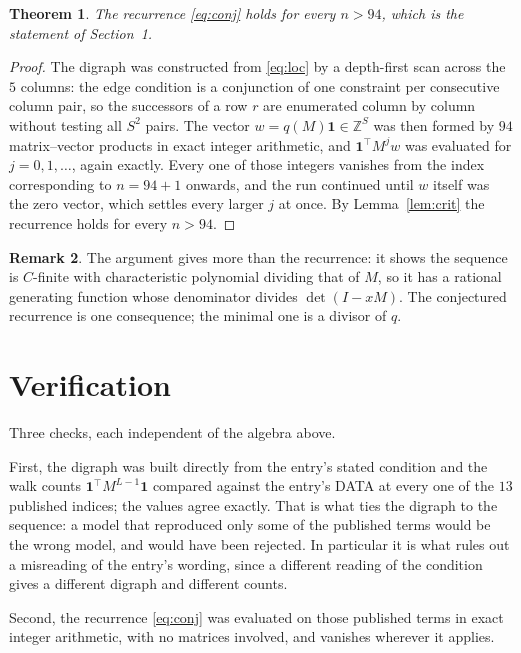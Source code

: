 \documentclass[11pt,a4paper]{article}
\theoremstyle{plain}
\newtheorem{theorem}{Theorem}
\theoremstyle{definition}
\newtheorem{remark}[theorem]{Remark}
\begin{document}
\begin{theorem}
The recurrence \eqref{eq:conj} holds for every $n>94$, which is the statement of
Section~1.
\end{theorem}

\begin{proof}
The digraph was constructed from \eqref{eq:loc} by a depth-first scan across the $5$
columns: the edge condition is a conjunction of one constraint per consecutive column
pair, so the successors of a row $r$ are enumerated column by column without testing all
$S^2$ pairs. The vector $w=q(M)\mathbf{1}\in\mathbb{Z}^{S}$ was then formed by $94$
matrix--vector products in exact integer arithmetic, and $\mathbf{1}^{\!\top}M^{j}w$ was
evaluated for $j=0,1,\dots$, again exactly. Every one of those integers vanishes from the
index corresponding to $n=94+1$ onwards, and the run continued until $w$ itself was the
zero vector, which settles every larger $j$ at once. By Lemma~\ref{lem:crit} the recurrence
holds for every $n>94$.
\end{proof}

\begin{remark}
The argument gives more than the recurrence: it shows the sequence is $C$-finite with
characteristic polynomial dividing that of $M$, so it has a rational generating function
whose denominator divides $\det(I-xM)$. The conjectured recurrence is one consequence; the
minimal one is a divisor of $q$.
\end{remark}

\section{Verification}

Three checks, each independent of the algebra above.

First, the digraph was built directly from the entry's stated condition and the walk counts
$\mathbf{1}^{\!\top}M^{L-1}\mathbf{1}$ compared against the entry's DATA at
every one of the $13$ published indices; the values agree exactly. That is what ties
the digraph to the sequence: a model that reproduced only some of the published terms would
be the wrong model, and would have been rejected. In particular it is what rules out a
misreading of the entry's wording, since a different reading of the condition gives a
different digraph and different counts.

Second, the recurrence \eqref{eq:conj} was evaluated on those published terms in exact
integer arithmetic, with no matrices involved, and vanishes wherever it applies.
\end{document}
